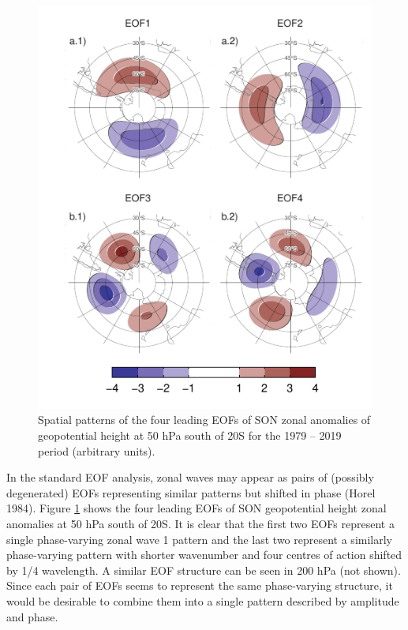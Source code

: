 \documentclass[smallextended]{svjour3}       %
\begin{document}
\begin{figure}
\centering
\includegraphics{../figures/eof-naive-1.pdf}
\caption{\label{fig:eof-naive}Spatial patterns of the four leading EOFs of SON zonal anomalies of geopotential height at 50 hPa south of 20\degree S for the 1979 -- 2019 period (arbitrary units).}
\end{figure}

In the standard EOF analysis, zonal waves may appear as pairs of (possibly degenerated) EOFs representing similar patterns but shifted in phase (Horel 1984).
Figure \ref{fig:eof-naive} shows the four leading EOFs of SON geopotential height zonal anomalies at 50 hPa south of 20\degree S.
It is clear that the first two EOFs represent a single phase-varying zonal wave 1 pattern and the last two represent a similarly phase-varying pattern with shorter wavenumber and four centres of action shifted by 1/4 wavelength.
A similar EOF structure can be seen in 200 hPa (not shown).
Since each pair of EOFs seems to represent the same phase-varying structure, it would be desirable to combine them into a single pattern described by amplitude and phase.
\end{document}
